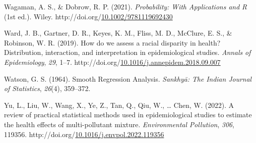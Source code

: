 \documentclass[12pt, twoside]{amherstthesis}
\newenvironment{CSLReferences}[2]%
  {}%
  {\par}
\begin{document}
\begin{CSLReferences}{1}{0}
\leavevmode{}%
Wagaman, A. S., \& Dobrow, R. P. (2021). \emph{Probability: {With} {Applications} and {R}} (1st ed.). Wiley. http://doi.org/\href{https://doi.org/10.1002/9781119692430}{10.1002/9781119692430}

\leavevmode{}%
Ward, J. B., Gartner, D. R., Keyes, K. M., Fliss, M. D., McClure, E. S., \& Robinson, W. R. (2019). How do we assess a racial disparity in health? {Distribution}, interaction, and interpretation in epidemiological studies. \emph{Annals of Epidemiology}, \emph{29}, 1--7. http://doi.org/\href{https://doi.org/10.1016/j.annepidem.2018.09.007}{10.1016/j.annepidem.2018.09.007}

\leavevmode{}%
Watson, G. S. (1964). Smooth {Regression} {Analysis}. \emph{Sankhyā: The Indian Journal of Statistics}, \emph{26}(4), 359--372.

\leavevmode{}%
Yu, L., Liu, W., Wang, X., Ye, Z., Tan, Q., Qiu, W., \ldots{} Chen, W. (2022). A review of practical statistical methods used in epidemiological studies to estimate the health effects of multi-pollutant mixture. \emph{Environmental Pollution}, \emph{306}, 119356. http://doi.org/\href{https://doi.org/10.1016/j.envpol.2022.119356}{10.1016/j.envpol.2022.119356}

\end{CSLReferences}
\end{document}

